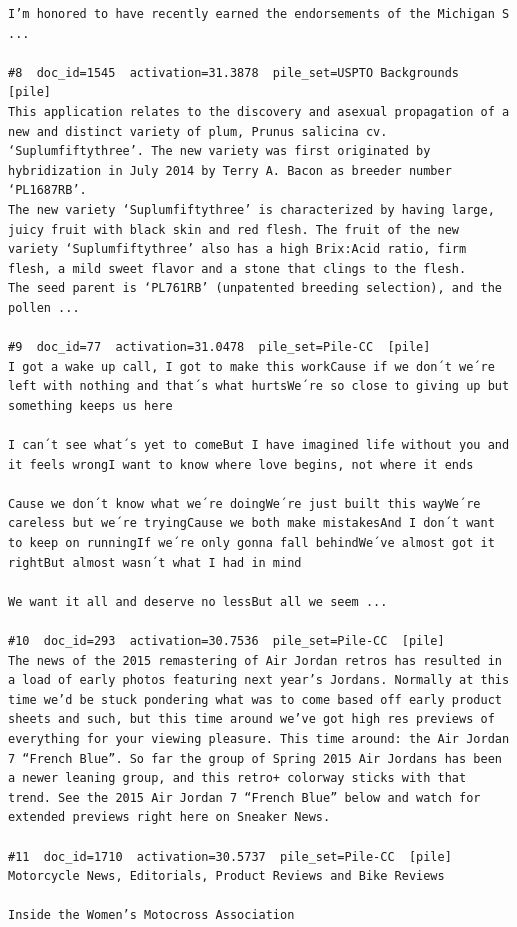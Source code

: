 \begin{verbatim}
I’m honored to have recently earned the endorsements of the Michigan S ...

#8  doc_id=1545  activation=31.3878  pile_set=USPTO Backgrounds  [pile]
This application relates to the discovery and asexual propagation of a new and distinct variety of plum, Prunus salicina cv. ‘Suplumfiftythree’. The new variety was first originated by hybridization in July 2014 by Terry A. Bacon as breeder number ‘PL1687RB’.
The new variety ‘Suplumfiftythree’ is characterized by having large, juicy fruit with black skin and red flesh. The fruit of the new variety ‘Suplumfiftythree’ also has a high Brix:Acid ratio, firm flesh, a mild sweet flavor and a stone that clings to the flesh.
The seed parent is ‘PL761RB’ (unpatented breeding selection), and the pollen ...

#9  doc_id=77  activation=31.0478  pile_set=Pile-CC  [pile]
I got a wake up call, I got to make this workCause if we don´t we´re left with nothing and that´s what hurtsWe´re so close to giving up but something keeps us here

I can´t see what´s yet to comeBut I have imagined life without you and it feels wrongI want to know where love begins, not where it ends

Cause we don´t know what we´re doingWe´re just built this wayWe´re careless but we´re tryingCause we both make mistakesAnd I don´t want to keep on runningIf we´re only gonna fall behindWe´ve almost got it rightBut almost wasn´t what I had in mind

We want it all and deserve no lessBut all we seem ...

#10  doc_id=293  activation=30.7536  pile_set=Pile-CC  [pile]
The news of the 2015 remastering of Air Jordan retros has resulted in a load of early photos featuring next year’s Jordans. Normally at this time we’d be stuck pondering what was to come based off early product sheets and such, but this time around we’ve got high res previews of everything for your viewing pleasure. This time around: the Air Jordan 7 “French Blue”. So far the group of Spring 2015 Air Jordans has been a newer leaning group, and this retro+ colorway sticks with that trend. See the 2015 Air Jordan 7 “French Blue” below and watch for extended previews right here on Sneaker News.

#11  doc_id=1710  activation=30.5737  pile_set=Pile-CC  [pile]
Motorcycle News, Editorials, Product Reviews and Bike Reviews

Inside the Women’s Motocross Association


\end{verbatim}
